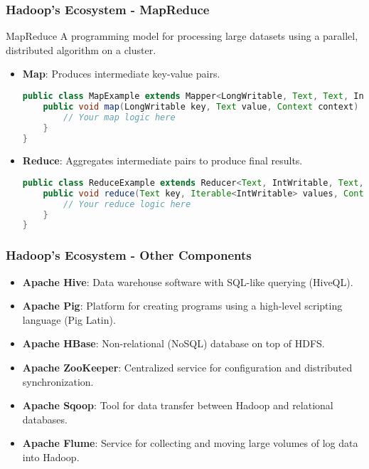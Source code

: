 \documentclass[aspectratio=169]{beamer}
\begin{document}
\begin{frame}[fragile]
    \frametitle{Hadoop's Ecosystem - MapReduce}
    \begin{block}{MapReduce}
        A programming model for processing large datasets using a parallel, distributed algorithm on a cluster.
        
        \begin{itemize}
            \item \textbf{Map}: Produces intermediate key-value pairs.
            \begin{lstlisting}[language=java]
public class MapExample extends Mapper<LongWritable, Text, Text, IntWritable> {
    public void map(LongWritable key, Text value, Context context) {
        // Your map logic here
    }
}
            \end{lstlisting}
            
            \item \textbf{Reduce}: Aggregates intermediate pairs to produce final results.
            \begin{lstlisting}[language=java]
public class ReduceExample extends Reducer<Text, IntWritable, Text, IntWritable> {
    public void reduce(Text key, Iterable<IntWritable> values, Context context) {
        // Your reduce logic here
    }
}
            \end{lstlisting}
        \end{itemize}
    \end{block}
\end{frame}

\begin{frame}[fragile]
    \frametitle{Hadoop's Ecosystem - Other Components}
    \begin{itemize}
        \item \textbf{Apache Hive}: Data warehouse software with SQL-like querying (HiveQL).
        \item \textbf{Apache Pig}: Platform for creating programs using a high-level scripting language (Pig Latin).
        \item \textbf{Apache HBase}: Non-relational (NoSQL) database on top of HDFS.
        \item \textbf{Apache ZooKeeper}: Centralized service for configuration and distributed synchronization.
        \item \textbf{Apache Sqoop}: Tool for data transfer between Hadoop and relational databases.
        \item \textbf{Apache Flume}: Service for collecting and moving large volumes of log data into Hadoop.
    \end{itemize}
\end{frame}
\end{document}
